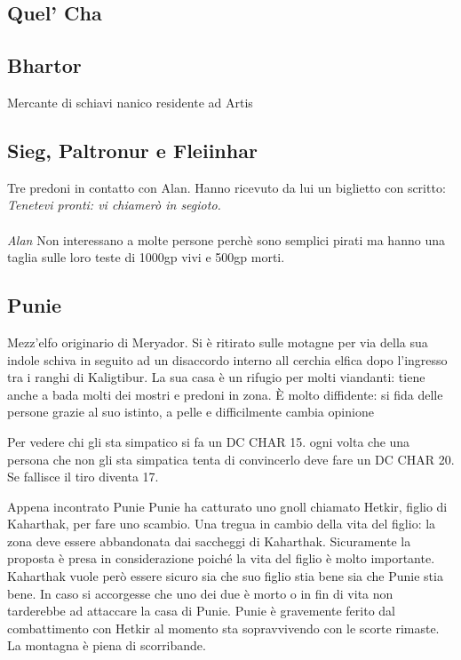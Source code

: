 \documentclass[10pt,twoside,twocolumn]{article}
\begin{document}
\subsection{Quel' Cha}
\label{char:quelcha}
\subsection{Bhartor}\label{char:bhartor}
Mercante di schiavi nanico residente ad Artis
\subsection{Sieg, Paltronur e Fleiinhar}\label{char:sieg}
Tre predoni in contatto con Alan. Hanno ricevuto da lui un biglietto con scritto: \\
\textit{
  Tenetevi pronti: vi chiamer\`o in segioto. \\ \\Alan}
Non interessano a molte persone perch\`e sono semplici pirati ma hanno una taglia
sulle loro teste di 1000gp vivi e 500gp morti.
\subsection{Punie}
Mezz'elfo originario di Meryador. Si \`e ritirato sulle motagne per via della sua indole
schiva in seguito ad un disaccordo interno all cerchia elfica dopo l'ingresso tra
i ranghi di Kaligtibur.
La sua casa \`e un rifugio per molti viandanti: tiene anche a bada molti dei mostri e
predoni in zona.
\`E molto diffidente: si fida delle persone grazie al suo istinto, a pelle e difficilmente
cambia opinione
\begin{quotebox}
  Per vedere chi gli sta simpatico si fa un DC CHAR 15. ogni volta che una persona che non gli sta
  simpatica tenta di convincerlo deve fare un DC CHAR 20. Se fallisce il tiro diventa 17.
\end{quotebox}
\begin{commentbox}{Appena incontrato Punie}
Punie ha catturato uno gnoll chiamato Hetkir, figlio di Kaharthak, per fare uno scambio.
Una tregua in cambio della vita del figlio: la zona deve essere abbandonata dai saccheggi di
Kaharthak. Sicuramente la proposta \`e presa in considerazione poich\'e la vita
del figlio \`e molto importante. Kaharthak vuole per\`o essere sicuro sia che suo figlio stia
bene sia che Punie stia bene. In caso si accorgesse che uno dei due \`e morto o in fin di vita
non tarderebbe ad attaccare la casa di Punie. Punie \`e gravemente ferito dal combattimento
con Hetkir al momento sta sopravvivendo con le scorte rimaste. La montagna \`e piena di scorribande.
\end{commentbox}
\end{document}
